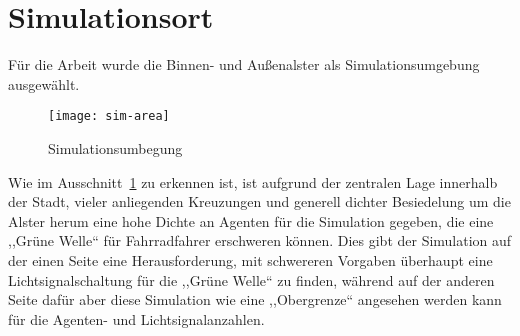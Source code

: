 %


\section{Simulationsort}\label{sec:simulationplace}

Für die Arbeit wurde die Binnen- und Außenalster als Simulationsumgebung ausgewählt.

\begin{figure}[h]
    \centering
    \texttt{[image: sim-area]}
    \caption{Simulationsumbegung}
    \label{fig:sim-area}
\end{figure}

Wie im Ausschnitt~\ref{fig:sim-area} zu erkennen ist, ist aufgrund der zentralen Lage innerhalb der Stadt, vieler anliegenden Kreuzungen und generell dichter Besiedelung um die Alster herum eine hohe Dichte an Agenten für die Simulation gegeben, die eine ,,Grüne Welle`` für Fahrradfahrer erschweren können.
Dies gibt der Simulation auf der einen Seite eine Herausforderung, mit schwereren Vorgaben überhaupt eine Lichtsignalschaltung für die ,,Grüne Welle`` zu finden, während auf der anderen Seite dafür aber diese Simulation wie eine ,,Obergrenze`` angesehen werden kann für die Agenten- und Lichtsignalanzahlen.
